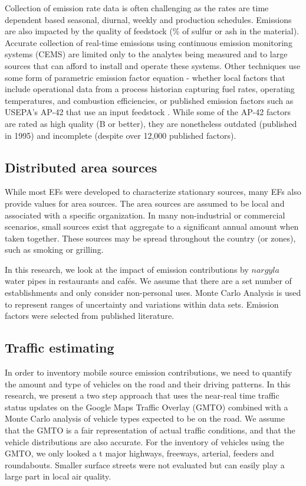 Collection of emission rate data is often challenging as the rates are time dependent based seasonal, diurnal, weekly and production schedules. Emissions are also impacted by the quality of feedstock (\% of sulfur or ash in the material). Accurate collection of real-time emissions using continuous emission monitoring systems (CEMS) are limited only to the analytes being measured and to large sources that can afford to install and operate these systems. Other techniques use some form of parametric emission factor equation - whether local factors that include operational data from a process historian capturing fuel rates, operating temperatures, and combustion efficiencies, or published emission factors such as USEPA's AP-42 that use an input feedstock \cite{USEPA1995}. While some of the AP-42 factors are rated as high quality (B or better), they are nonetheless outdated (published in 1995) and incomplete (despite over 12,000 published factors).

\subsection{Distributed area sources}
While most EFs were developed to characterize stationary sources, many EFs also provide values for area sources. The area sources are assumed to be local and associated with a specific organization. In many non-industrial or commercial scenarios, small sources exist that aggregate to a significant annual amount when taken together.  These sources may be spread throughout the country (or zones), such as smoking or grilling.

In this research, we look at the impact of emission contributions by $nargyla$ water pipes in restaurants and caf\'es. We assume that there are a set number of establishments and only consider non-personal uses.  Monte Carlo Analysis is used to represent ranges of uncertainty and variations within data sets. Emission factors were selected from published literature.

\subsection{Traffic estimating}
In order to inventory mobile source emission contributions, we need to quantify the amount and type of vehicles on the road and their driving patterns. In this research, we present a two step approach that uses the near-real time traffic status updates on the Google Maps Traffic Overlay (GMTO) combined with a Monte Carlo analysis of vehicle types expected to be on the road. We assume that the GMTO is a fair representation of actual traffic conditions, and that the vehicle distributions are also accurate. For the inventory of vehicles using the GMTO, we only looked a t major highways, freeways, arterial, feeders and roundabouts. Smaller surface streets were not evaluated but can easily play a large part in local air quality.

